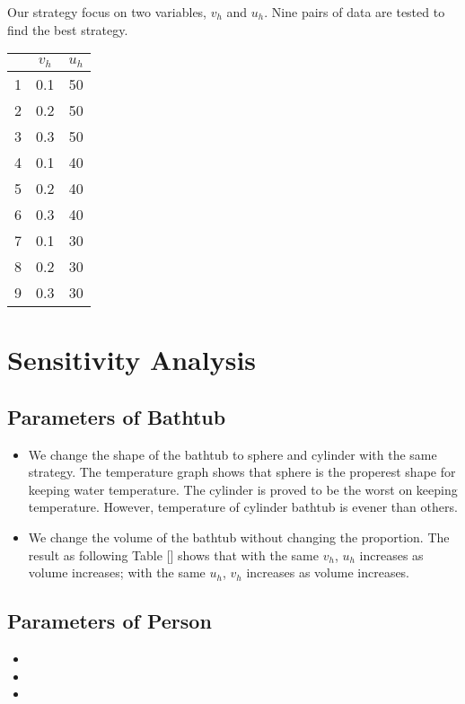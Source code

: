\documentclass[12pt,a4paper,titlepage]{article}
\begin{document}
Our strategy focus on two variables, $v_h$ and $u_h$. Nine pairs of data are tested to find the best strategy.
\begin{center}
\begin{tabular}{|c|c|c|}
\hline
      &$v_h$  &$u_h$        \\ \hline
 1    &0.1             & 50              \\ \hline
 2    &0.2             & 50              \\ \hline
 3    &0.3             & 50              \\ \hline
 4    &0.1             & 40              \\ \hline
 5    &0.2             & 40              \\ \hline
 6    &0.3             & 40              \\ \hline
 7    &0.1             & 30              \\ \hline
 8    &0.2             & 30              \\ \hline
 9    &0.3             & 30              \\ \hline
\end{tabular}
\end{center}


\section{Sensitivity Analysis}
\label{sec:sensitivity-analysis}

\subsection{Parameters of Bathtub}
\label{sec:parameters of bathtub}
\begin{itemize}
\item We change the shape of the bathtub to sphere and cylinder with the same strategy. The temperature graph shows that sphere is the properest shape for keeping water temperature. The cylinder is proved to be the worst on keeping temperature. However, temperature of cylinder bathtub is evener than others.
\item We change the volume of the bathtub without changing the proportion. The result as following Table [] shows that with the same $v_h$, $u_h$ increases as volume increases; with the same $u_h$, $v_h$ increases as volume increases.
\end{itemize}

\subsection{Parameters of Person}
\label{sec:parameters of person}
\begin{itemize}
\item
\item
\item
\end{itemize}
\end{document}
